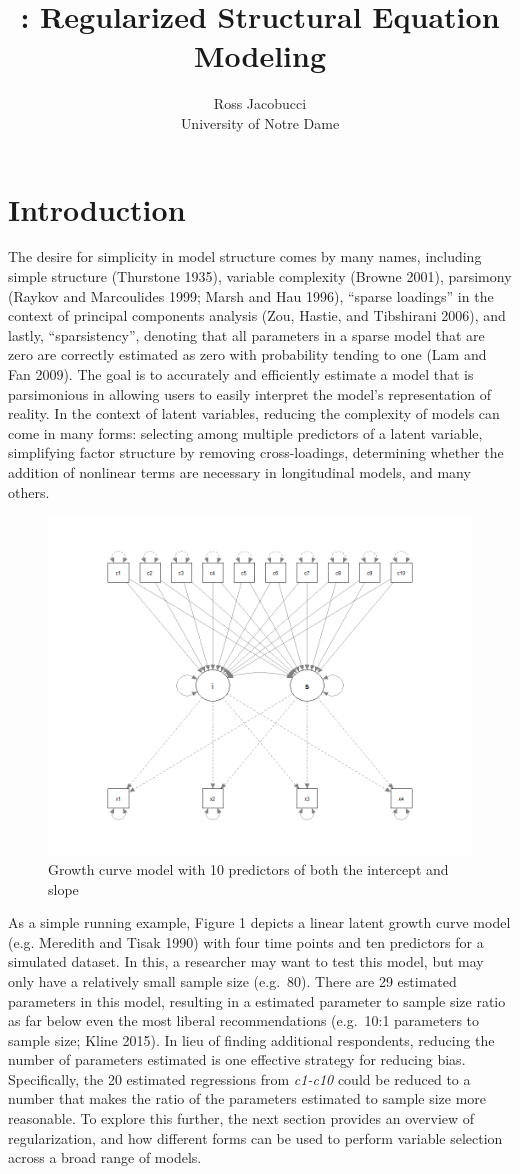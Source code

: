 \documentclass[article]{jss}
\author{
Ross Jacobucci\\University of Notre Dame
}
\title{\pkg{regsem}: Regularized Structural Equation Modeling}
\begin{document}
\section{Introduction}\label{introduction}

The desire for simplicity in model structure comes by many names,
including simple structure (Thurstone 1935), variable complexity (Browne
2001), parsimony (Raykov and Marcoulides 1999; Marsh and Hau 1996),
``sparse loadings'' in the context of principal components analysis
(Zou, Hastie, and Tibshirani 2006), and lastly, ``sparsistency'',
denoting that all parameters in a sparse model that are zero are
correctly estimated as zero with probability tending to one (Lam and Fan
2009). The goal is to accurately and efficiently estimate a model that
is parsimonious in allowing users to easily interpret the model's
representation of reality. In the context of latent variables, reducing
the complexity of models can come in many forms: selecting among
multiple predictors of a latent variable, simplifying factor structure
by removing cross-loadings, determining whether the addition of
nonlinear terms are necessary in longitudinal models, and many others.

\begin{figure}
    \centering
    \includegraphics[width=.5\linewidth]{figs/growth_fig}
    \caption{Growth curve model with 10 predictors of both the intercept and slope}
\end{figure}

As a simple running example, Figure 1 depicts a linear latent growth
curve model (e.g. Meredith and Tisak 1990) with four time points and ten
predictors for a simulated dataset. In this, a researcher may want to
test this model, but may only have a relatively small sample size
(e.g.~80). There are 29 estimated parameters in this model, resulting in
a estimated parameter to sample size ratio as far below even the most
liberal recommendations (e.g.~10:1 parameters to sample size; Kline
2015). In lieu of finding additional respondents, reducing the number of
parameters estimated is one effective strategy for reducing bias.
Specifically, the 20 estimated regressions from \textit{c1-c10} could be
reduced to a number that makes the ratio of the parameters estimated to
sample size more reasonable. To explore this further, the next section
provides an overview of regularization, and how different forms can be
used to perform variable selection across a broad range of models.
\end{document}
